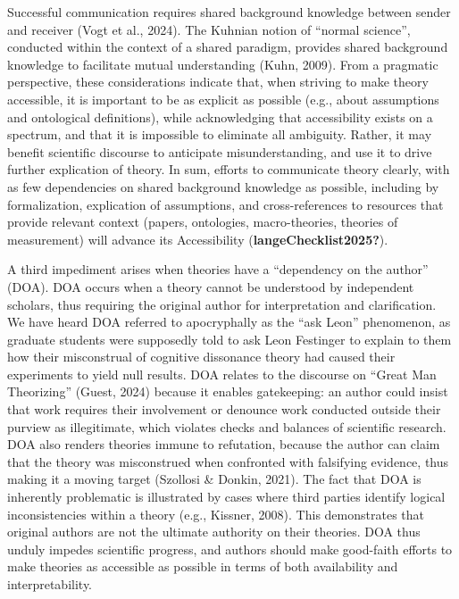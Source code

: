 \documentclass[
  man,floatsintext]{apa6}
\begin{document}
Successful communication requires shared background knowledge between sender and receiver (Vogt et al., 2024).
The Kuhnian notion of ``normal science'', conducted within the context of a shared paradigm, provides shared background knowledge to facilitate mutual understanding (Kuhn, 2009).
From a pragmatic perspective, these considerations indicate that,
when striving to make theory accessible,
it is important to be as explicit as possible (e.g., about assumptions and ontological definitions),
while acknowledging that accessibility exists on a spectrum,
and that it is impossible to eliminate all ambiguity.
Rather, it may benefit scientific discourse to anticipate misunderstanding,
and use it to drive further explication of theory.
In sum, efforts to communicate theory clearly, with as few dependencies on shared background knowledge as possible, including by formalization, explication of assumptions,
and cross-references to resources that provide relevant context (papers, ontologies, macro-theories, theories of measurement)
will advance its Accessibility (\textbf{langeChecklist2025?}).

A third impediment arises when theories have a ``dependency on the author'' (DOA).
DOA occurs when a theory cannot be understood by independent scholars,
thus requiring the original author for interpretation and clarification.
We have heard DOA referred to apocryphally as the ``ask Leon'' phenomenon,
as graduate students were supposedly told to ask Leon Festinger to explain to them how their misconstrual of cognitive dissonance theory had caused their experiments to yield null results.
DOA relates to the discourse on ``Great Man Theorizing'' (Guest, 2024) because it enables gatekeeping: an author could insist that work requires their involvement or denounce work conducted outside their purview as illegitimate,
which violates checks and balances of scientific research.
DOA also renders theories immune to refutation,
because the author can claim that the theory was misconstrued when confronted with falsifying evidence, thus making it a moving target (Szollosi \& Donkin, 2021).
The fact that DOA is inherently problematic is illustrated by cases where third parties identify logical inconsistencies within a theory (e.g., Kissner, 2008).
This demonstrates that original authors are not the ultimate authority on their theories.
DOA thus unduly impedes scientific progress, and authors should make good-faith efforts to make theories as accessible as possible in terms of both availability and interpretability.
\end{document}

